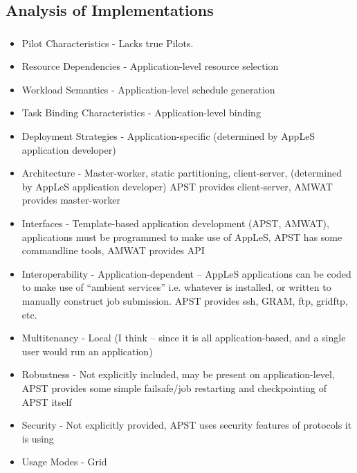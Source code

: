 \documentclass{sig-alternate}
\begin{document}
\subsection{Analysis of \pilotjob Implementations}


%
\subsubsection{\apples}
\begin{itemize}
  \item
    Pilot Characteristics - Lacks true Pilots.
  \item
    Resource Dependencies - Application-level resource selection
  \item
    Workload Semantics - Application-level schedule generation
  \item
    Task Binding Characteristics - Application-level binding
  \item
    Deployment Strategies - Application-specific (determined
    by AppLeS application developer)
  \item
    Architecture - Master-worker, static partitioning,
    client-server, (determined
    by AppLeS application developer)  APST provides client-server,
    AMWAT provides master-worker
  \item
    Interfaces - Template-based application development (APST, AMWAT), applications
    must be programmed to make use of AppLeS, APST has some commandline tools,
    AMWAT provides API
  \item
    Interoperability - Application-dependent -- AppLeS applications
    can be coded to make use of ``ambient services'' i.e. whatever
    is installed, or written to manually construct job submission.
    APST provides ssh, GRAM, ftp, gridftp, etc.
  \item
    Multitenancy - Local (I think -- since it is all application-based,
    and a single user would run an application)
  \item
    Robustness - Not explicitly included, may be present on
    application-level, APST provides some simple failsafe/job restarting and
    checkpointing of APST itself
  \item
    Security - Not explicitly provided, APST uses security features
    of protocols it is using
  \item
    Usage Modes - Grid
\end{itemize}
\end{document}

